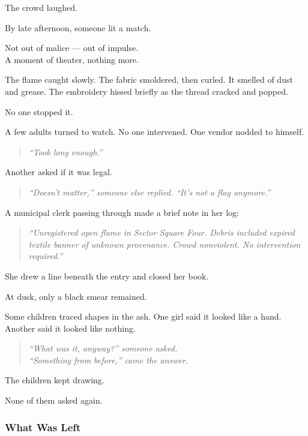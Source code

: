 \documentclass[12pt]{article}
\begin{document}
The crowd laughed.

By late afternoon, someone lit a match.

Not out of malice --- out of impulse.\\
A moment of theater, nothing more.

The flame caught slowly. The fabric smoldered, then curled. It smelled of dust and grease. The embroidery hissed briefly as the thread cracked and popped.

No one stopped it.

A few adults turned to watch. No one intervened. One vendor nodded to himself.

\begin{quote}
\textit{“Took long enough.”}
\end{quote}

Another asked if it was legal.

\begin{quote}
\textit{“Doesn’t matter,” someone else replied. “It’s not a flag anymore.”}
\end{quote}

\vspace{1em}

A municipal clerk passing through made a brief note in her log:

\begin{quote}
\textit{“Unregistered open flame in Sector Square Four. Debris included expired textile banner of unknown provenance. Crowd nonviolent. No intervention required.”}
\end{quote}

She drew a line beneath the entry and closed her book.

\vspace{1em}

At dusk, only a black smear remained.

Some children traced shapes in the ash. One girl said it looked like a hand. Another said it looked like nothing.

\begin{quote}
\textit{“What was it, anyway?” someone asked.}
\\
\textit{“Something from before,” came the answer.}
\end{quote}

The children kept drawing.

None of them asked again.

\dotfill

\subsubsection*{What Was Left}
\end{document}
